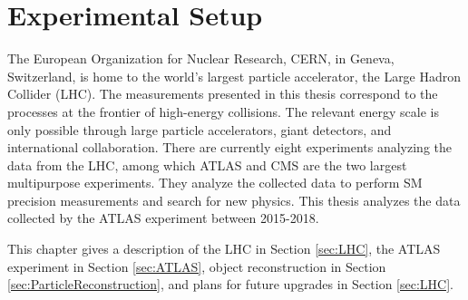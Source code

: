 \part{\LARGE{Experimental Setup}}
\label{sec:Experiment}

The European Organization for Nuclear Research, CERN, in Geneva, Switzerland, is home to the world's largest particle accelerator, the Large Hadron Collider (LHC). The measurements presented in this thesis correspond to the processes at the frontier of high-energy collisions. The relevant energy scale is only possible through large particle accelerators, giant detectors, and international collaboration. There are currently eight experiments analyzing the data from the LHC, among which ATLAS and CMS are the two largest multipurpose experiments. They analyze the collected data to perform SM precision measurements and search for new physics. This thesis analyzes the data collected by the ATLAS experiment between 2015-2018.

This chapter gives a description of the LHC in Section \ref{sec:LHC}, the ATLAS experiment in Section \ref{sec:ATLAS}, object reconstruction in Section \ref{sec:ParticleReconstruction}, and plans for future upgrades in Section \ref{sec:LHC}. 
